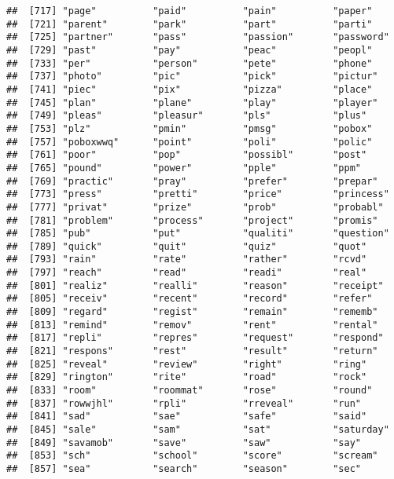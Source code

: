 \documentclass[]{article}
\begin{document}
\begin{verbatim}
##  [717] "page"          "paid"          "pain"          "paper"        
##  [721] "parent"        "park"          "part"          "parti"        
##  [725] "partner"       "pass"          "passion"       "password"     
##  [729] "past"          "pay"           "peac"          "peopl"        
##  [733] "per"           "person"        "pete"          "phone"        
##  [737] "photo"         "pic"           "pick"          "pictur"       
##  [741] "piec"          "pix"           "pizza"         "place"        
##  [745] "plan"          "plane"         "play"          "player"       
##  [749] "pleas"         "pleasur"       "pls"           "plus"         
##  [753] "plz"           "pmin"          "pmsg"          "pobox"        
##  [757] "poboxwwq"      "point"         "poli"          "polic"        
##  [761] "poor"          "pop"           "possibl"       "post"         
##  [765] "pound"         "power"         "pple"          "ppm"          
##  [769] "practic"       "pray"          "prefer"        "prepar"       
##  [773] "press"         "pretti"        "price"         "princess"     
##  [777] "privat"        "prize"         "prob"          "probabl"      
##  [781] "problem"       "process"       "project"       "promis"       
##  [785] "pub"           "put"           "qualiti"       "question"     
##  [789] "quick"         "quit"          "quiz"          "quot"         
##  [793] "rain"          "rate"          "rather"        "rcvd"         
##  [797] "reach"         "read"          "readi"         "real"         
##  [801] "realiz"        "realli"        "reason"        "receipt"      
##  [805] "receiv"        "recent"        "record"        "refer"        
##  [809] "regard"        "regist"        "remain"        "rememb"       
##  [813] "remind"        "remov"         "rent"          "rental"       
##  [817] "repli"         "repres"        "request"       "respond"      
##  [821] "respons"       "rest"          "result"        "return"       
##  [825] "reveal"        "review"        "right"         "ring"         
##  [829] "rington"       "rite"          "road"          "rock"         
##  [833] "room"          "roommat"       "rose"          "round"        
##  [837] "rowwjhl"       "rpli"          "rreveal"       "run"          
##  [841] "sad"           "sae"           "safe"          "said"         
##  [845] "sale"          "sam"           "sat"           "saturday"     
##  [849] "savamob"       "save"          "saw"           "say"          
##  [853] "sch"           "school"        "score"         "scream"       
##  [857] "sea"           "search"        "season"        "sec"          

\end{verbatim}
\end{document}
